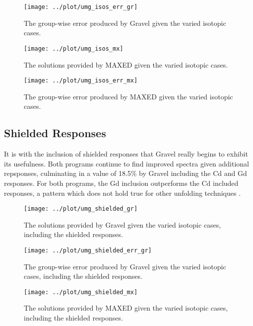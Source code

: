 \documentclass[journal]{IEEEtran}
\begin{document}
\begin{figure}[h!tb]
  \centering
  \texttt{[image: ../plot/umg\_isos\_err\_gr]}
  \caption{The group-wise error produced by Gravel given the varied isotopic cases.}
  \label{fig:isos_err_gr}
\end{figure}

\begin{figure}[h!tb]
  \centering
  \texttt{[image: ../plot/umg\_isos\_mx]}
  \caption{The solutions provided by MAXED given the varied  isotopic cases.}
  \label{fig:isos_mx}
\end{figure}

\begin{figure}[h!tb]
  \centering
  \texttt{[image: ../plot/umg\_isos\_err\_mx]}
  \caption{The group-wise error produced by MAXED given the varied  isotopic cases.}
  \label{fig:isos_err_mx}
\end{figure}

\subsection{Shielded Responses}

It is with the inclusion of shielded responses that Gravel really begins to exhibit its usefulness.
Both programs continue to find improved spectra given additional repsponses, culminating in a value of 18.5\% by Gravel including the Cd and Gd responses.
For both programs, the Gd inclusion outperforms the Cd included responses, a pattern which does not hold true for other unfolding techniques \cite{roberts2018use}.

\begin{figure}[h!tb]
  \centering
  \texttt{[image: ../plot/umg\_shielded\_gr]}
  \caption{The solutions provided by Gravel given the varied isotopic cases, including the shielded responses.}
  \label{fig:shielded_gr}
\end{figure}

\begin{figure}[h!tb]
  \centering
  \texttt{[image: ../plot/umg\_shielded\_err\_gr]}
  \caption{The group-wise error produced by Gravel given the varied isotopic cases, including the shielded responses.}
  \label{fig:shielded_err_gr}
\end{figure}

\begin{figure}[h!tb]
  \centering
  \texttt{[image: ../plot/umg\_shielded\_mx]}
  \caption{The solutions provided by MAXED given the varied isotopic cases, including the shielded responses.}
  \label{fig:shielded_mx}
\end{figure}
\end{document}

